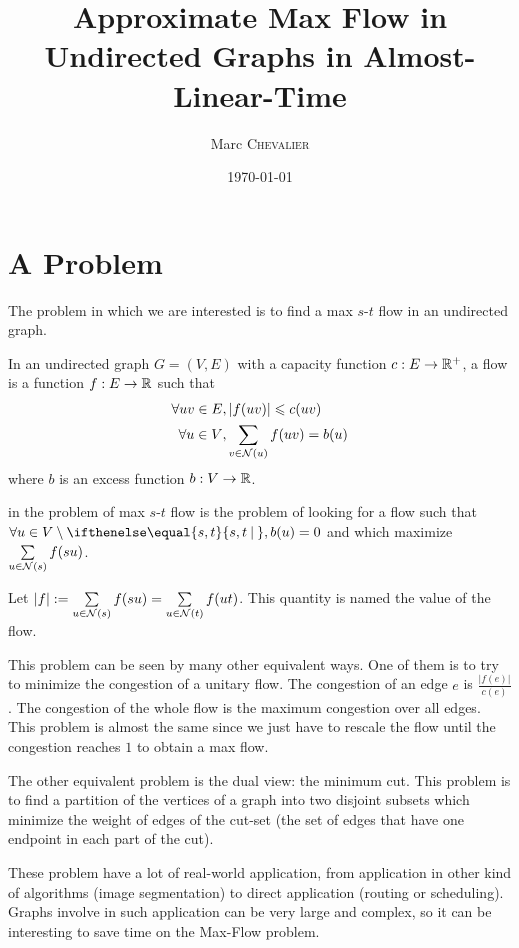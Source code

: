 

\title{Approximate Max Flow in Undirected Graphs in Almost-Linear-Time}
\author{Marc \textsc{Chevalier}}
\date{\today}



\maketitle

\section{A Problem}
The problem in which we are interested is to find a max $s$-$t$ flow in an undirected graph.

\bigskip

In an undirected graph $G=(V,E)$ with a capacity function $c:E\to\mathbb{R}^+$, a flow is a function $f:E\to\mathbb{R}$ such that
\[
    \begin{aligned}
        \forall uv\in E&, \lvert f(uv)\rvert \leqslant c(uv)\\
        \forall u\in V&, \sum\limits_{v\in \mathcal{N}(u)} f(uv)=b(u)
    \end{aligned}
\]
where $b$ is an excess function $b:V\to\mathbb{R}$.

\bigskip

in the problem of max $s$-$t$ flow is the problem of looking for a flow such that $\forall u\in V\setminus\set{s,t}{}, b(u) = 0$ and which maximize $\sum\limits_{u\in\mathcal{N}(s)} f(su)$.

Let $\lvert f \rvert := \sum\limits_{u\in\mathcal{N}(s)} f(su) = \sum\limits_{u\in\mathcal{N}(t)} f(ut)$. This quantity is named the value of the flow.

\bigskip

This problem can be seen by many other equivalent ways. One of them is to try to minimize the congestion of a unitary flow. The congestion of an edge $e$ is $\frac{\lvert f(e)\rvert}{c(e)}$. The congestion of the whole flow is the maximum congestion over all edges. This problem is almost the same since we just have to rescale the flow until the congestion reaches $1$ to obtain a max flow.

The other equivalent problem is the dual view: the minimum cut. This problem is to find a partition of the vertices of a graph into two disjoint subsets which minimize the weight of edges of the cut-set (the set of edges that have one endpoint in each part of the cut).

These problem have a lot of real-world application, from application in other kind of algorithms (image segmentation) to direct application (routing or scheduling). Graphs involve in such application can be very large and complex, so it can be interesting to save time on the Max-Flow problem.

